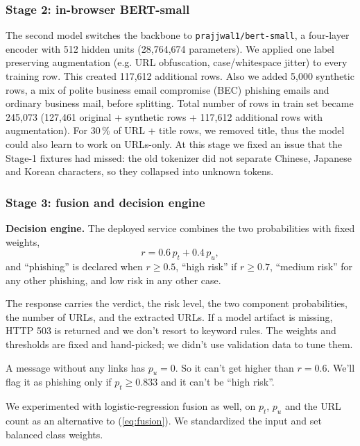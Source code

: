 \documentclass[conference]{IEEEtran}
\begin{document}
\subsubsection{Stage 2: in-browser BERT-small}\label{sec:stage2}
The second model switches the backbone to \texttt{prajjwal1/bert-small}, a four-layer encoder with 512 hidden units (28,764,674 parameters). We applied one label preserving augmentation (e.g. URL obfuscation, case/whitespace jitter) to every training row. This created 117,612 additional rows. Also we added 5,000 synthetic rows, a mix of polite business email compromise (BEC) phishing emails and ordinary business mail, before splitting. Total number of rows in train set became 245,073 (127,461 original + synthetic rows + 117,612 additional rows with augmentation). For 30\,\% of URL + title rows, we removed title, thus the model could also learn to work on URLs-only. At this stage we fixed an issue that the Stage-1 fixtures had missed: the old tokenizer did not separate Chinese, Japanese and Korean characters, so they collapsed into unknown tokens.

\subsubsection{Stage 3: fusion and decision engine}
\textbf{Decision engine.} The deployed service combines the two probabilities with fixed weights,
\begin{equation}
r = 0.6\,p_t + 0.4\,p_u ,
\label{eq:fusion}
\end{equation}
and ``phishing'' is declared when $r \ge 0.5$, ``high risk'' if $r \ge 0.7$, ``medium risk'' for any other phishing, and low risk in any other case.

The response carries the verdict, the risk level, the two component probabilities, the number of URLs, and the extracted URLs. If a model artifact is missing, HTTP 503 is returned and we don't resort to keyword rules. The weights and thresholds are fixed and hand-picked; we didn't use validation data to tune them.

A message without any links has $p_u = 0$. So it can't get higher than $r = 0.6$. We'll flag it as phishing only if $p_t \ge 0.833$ and it can't be ``high risk''.

We experimented with logistic-regression fusion as well, on $p_t$, $p_u$ and the URL count as an alternative to (\ref{eq:fusion}). We standardized the input and set balanced class weights.
\end{document}
